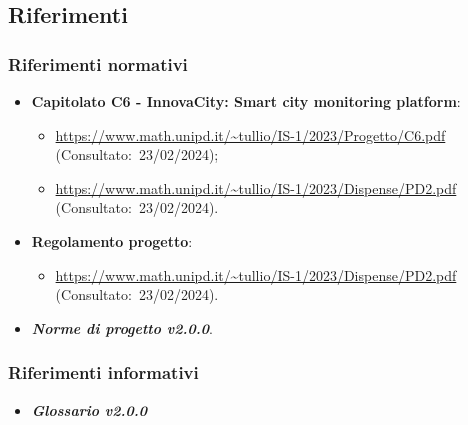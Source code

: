 \subsection{Riferimenti}
\subsubsection{Riferimenti normativi}
\begin{itemize}
    \item \textbf{Capitolato C6 - InnovaCity: Smart city monitoring platform}:
    \begin{itemize}
        \item \url{https://www.math.unipd.it/~tullio/IS-1/2023/Progetto/C6.pdf} (Consultato:~23/02/2024);
        \item \url{https://www.math.unipd.it/~tullio/IS-1/2023/Dispense/PD2.pdf} (Consultato:~23/02/2024).
    \end{itemize}
    \item \textbf{Regolamento progetto}:
    \begin{itemize}
        \item \url{https://www.math.unipd.it/~tullio/IS-1/2023/Dispense/PD2.pdf} (Consultato:~23/02/2024).
    \end{itemize}
    \item \textbf{\textit{Norme di progetto v2.0.0}}.
    
\end{itemize}
\subsubsection{Riferimenti informativi}
\begin{itemize}
    \item \textbf{\textit{Glossario v2.0.0}}
\end{itemize}
